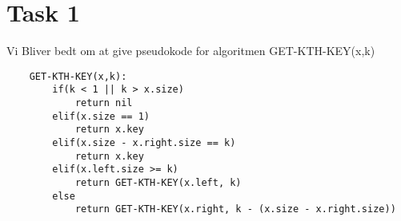 \section{Task 1}
Vi Bliver bedt om at give pseudokode for algoritmen GET-KTH-KEY(x,k)
\begin{lstlisting}
	GET-KTH-KEY(x,k):
		if(k < 1 || k > x.size)
			return nil
		elif(x.size == 1)
			return x.key
		elif(x.size - x.right.size == k)
			return x.key
		elif(x.left.size >= k)
			return GET-KTH-KEY(x.left, k)
		else
			return GET-KTH-KEY(x.right, k - (x.size - x.right.size))
\end{lstlisting}

